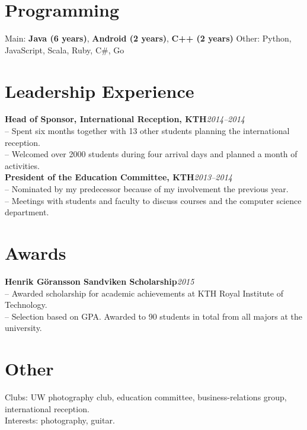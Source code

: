\documentclass[10pt]{article}
\begin{document}
\section*{Programming}
\vspace{0.1em}
\hline
\vspace{0.3em}
\indent Main: \textbf{Java (6 years)}, \textbf{Android (2 years)}, \textbf{C++ (2 years)}\hspace{2em} Other: Python, JavaScript, Scala, Ruby, C\#, Go\\

\section*{Leadership Experience}
\vspace{0.1em}
\hline
\vspace{0.3em}
\noindent\textbf{Head of Sponsor, International Reception, KTH}\hfill\textit{2014--2014} \\
\indent-- Spent six months together with 13 other students planning the international reception.\\
\indent-- Welcomed over 2000 students during four arrival days and planned a month of activities. \\

\noindent\textbf{President of the Education Committee, KTH}\hfill\textit{2013--2014} \\
\indent-- Nominated by my predecessor because of my involvement the previous year.\\
\indent-- Meetings with students and faculty to discuss courses and the computer science department.\\

\section*{Awards}
\vspace{0.1em}
\hline
\vspace{0.3em}
\textbf{Henrik Göransson Sandviken Scholarship}\hfill\textit{2015}\\
\indent-- Awarded scholarship for academic achievements at KTH Royal Institute of Technology.\\
\indent-- Selection based on GPA. Awarded to 90 students in total from all majors at the university.\\

\section*{Other}
\vspace{0.1em}
\hline
\vspace{0.3em}
\indent Clubs: UW photography club, education committee, business-relations group, international reception. \\
\indent Interests: photography, guitar.
\end{document}
